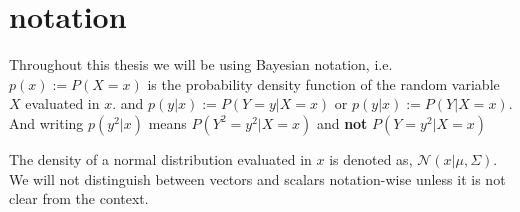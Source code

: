 




\section{notation}
Throughout this thesis we will be using Bayesian notation, i.e. $p(x) := P(X=x)$ is the probability
density function of the random variable $X$ evaluated in $x$. and $p(y|x) := P(Y=y|X=x)$ or $p(y|x)
:= P(Y|X=x)$. And writing $p(y^2|x)$ means $P(Y^2=y^2|X=x)$ and \textbf{not} $P(Y=y^2|X=x)$

The density of a normal distribution evaluated in $x$ is denoted as, $\mathcal{N}(x|\mu, \Sigma)$. 
We will not distinguish between vectors and scalars notation-wise unless it is not clear from the 
context. 


